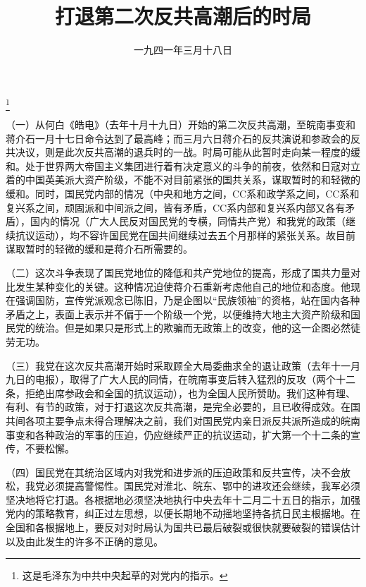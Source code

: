 
\title{打退第二次反共高潮后的时局}
\date{一九四一年三月十八日}
\thanks{这是毛泽东为中共中央起草的对党内的指示。}
\maketitle


（一）从何白《皓电》（去年十月十九日）开始的第二次反共高潮，至皖南事变和蒋介石一月十七日命令达到了最高峰；而三月六日蒋介石的反共演说和参政会的反共决议，则是此次反共高潮的退兵时的一战。时局可能从此暂时走向某一程度的缓和。处于世界两大帝国主义集团进行着有决定意义的斗争的前夜，依然和日寇对立着的中国英美派大资产阶级，不能不对目前紧张的国共关系，谋取暂时的和轻微的缓和。同时，国民党内部的情况（中央和地方之间，CC系和政学系之间，CC系和复兴系之间，顽固派和中间派之间，皆有矛盾，CC系内部和复兴系内部又各有矛盾），国内的情况（广大人民反对国民党的专横，同情共产党）和我党的政策（继续抗议运动），均不容许国民党在国共间继续过去五个月那样的紧张关系。故目前谋取暂时的轻微的缓和是蒋介石所需要的。

（二）这次斗争表现了国民党地位的降低和共产党地位的提高，形成了国共力量对比发生某种变化的关键。这种情况迫使蒋介石重新考虑他自己的地位和态度。他现在强调国防，宣传党派观念已陈旧，乃是企图以“民族领袖”的资格，站在国内各种矛盾之上，表面上表示并不偏于一个阶级一个党，以便维持大地主大资产阶级和国民党的统治。但是如果只是形式上的欺骗而无政策上的改变，他的这一企图必然徒劳无功。

（三）我党在这次反共高潮开始时采取顾全大局委曲求全的退让政策（去年十一月九日的电报），取得了广大人民的同情，在皖南事变后转入猛烈的反攻（两个十二条，拒绝出席参政会和全国的抗议运动），也为全国人民所赞助。我们这种有理、有利、有节的政策，对于打退这次反共高潮，是完全必要的，且已收得成效。在国共间各项主要争点未得合理解决之前，我们对国民党内亲日派反共派所造成的皖南事变和各种政治的军事的压迫，仍应继续严正的抗议运动，扩大第一个十二条的宣传，不要松懈。

（四）国民党在其统治区域内对我党和进步派的压迫政策和反共宣传，决不会放松，我党必须提高警惕性。国民党对淮北、皖东、鄂中的进攻还会继续，我军必须坚决地将它打退。各根据地必须坚决地执行中央去年十二月二十五日的指示，加强党内的策略教育，纠正过左思想，以便长期地不动摇地坚持各抗日民主根据地。在全国和各根据地上，要反对对时局认为国共已最后破裂或很快就要破裂的错误估计以及由此发生的许多不正确的意见。


